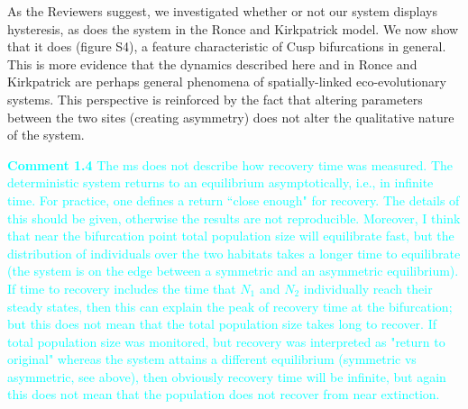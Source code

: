 \documentclass[ucm,12pt]{ucletter}
\newcounter{section}
\begin{document}
\begin{letter}

As the Reviewers suggest, we investigated whether or not our system displays hysteresis, as does the system in the Ronce and Kirkpatrick model.
We now show that it does (figure S4), a feature characteristic of Cusp bifurcations in general.
This is more evidence that the dynamics described here and in Ronce and Kirkpatrick are perhaps general phenomena of spatially-linked eco-evolutionary systems.
This perspective is reinforced by the fact that altering parameters between the two sites (creating asymmetry) does not alter the qualitative nature of the system.



\noindent \textcolor{cyan}{
{\bf Comment 1.4} The ms does not describe how recovery time was measured. The deterministic system returns to an equilibrium asymptotically, i.e., in infinite time. For practice, one defines a return ``close enough" for recovery. The details of this should be given, otherwise the results are not reproducible. Moreover, I think that near the bifurcation point total population size will equilibrate fast, but the distribution of individuals over the two habitats takes a longer time to equilibrate (the system is on the edge between a symmetric and an asymmetric equilibrium). If time to recovery includes the time that $N_1$ and $N_2$ individually reach their steady states, then this can explain the peak of recovery time at the bifurcation; but this does not mean that the total population size takes long to recover. If total population size was monitored, but recovery was interpreted as "return to original" whereas the system attains a different equilibrium (symmetric vs asymmetric, see above), then obviously recovery time will be infinite, but again this does not mean that the population does not recover from near extinction.
}


\end{letter}
\end{document}
